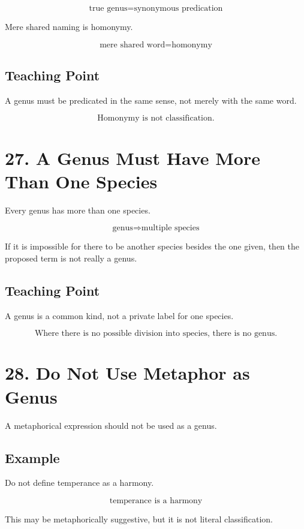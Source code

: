 \documentclass[12pt]{article}
\begin{document}
\[
\text{true genus} = \text{synonymous predication}
\]

Mere shared naming is homonymy.

\[
\text{mere shared word} = \text{homonymy}
\]

\subsection*{Teaching Point}

A genus must be predicated in the same sense, not merely with the same word.

\[
\boxed{
\text{Homonymy is not classification.}
}
\]

\section*{27. A Genus Must Have More Than One Species}

Every genus has more than one species.

\[
\text{genus} \Rightarrow \text{multiple species}
\]

If it is impossible for there to be another species besides the one given, then
the proposed term is not really a genus.

\subsection*{Teaching Point}

A genus is a common kind, not a private label for one species.

\[
\boxed{
\text{Where there is no possible division into species, there is no genus.}
}
\]

\section*{28. Do Not Use Metaphor as Genus}

A metaphorical expression should not be used as a genus.

\subsection*{Example}

Do not define temperance as a harmony.

\[
\text{temperance is a harmony}
\]

This may be metaphorically suggestive, but it is not literal classification.
\end{document}
